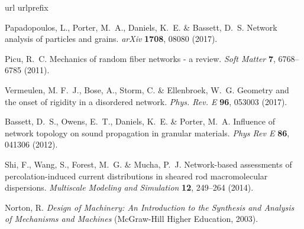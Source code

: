 \documentclass[%
preprint,
 amsmath,amssymb,
 aps,
]{revtex4-1}
\begin{document}
\begin{thebibliography}{10}
	\expandafter\ifx\csname url\endcsname\relax
	\def\url#1{\texttt{#1}}\fi
	\expandafter\ifx\csname urlprefix\endcsname\relax\def\urlprefix{URL }\fi
	\providecommand{\bibinfo}[2]{#2}
	\providecommand{\eprint}[2][]{\url{#2}}
	
	\bibinfo{author}{Papadopoulos, L.}, \bibinfo{author}{Porter, M.~A.},
	\bibinfo{author}{Daniels, K.~E.} \& \bibinfo{author}{Bassett, D.~S.}
	\newblock \bibinfo{title}{Network analysis of particles and grains}.
	\newblock \emph{\bibinfo{journal}{arXiv}} \textbf{\bibinfo{volume}{1708}},
	\bibinfo{pages}{08080} (\bibinfo{year}{2017}).
	
	\bibinfo{author}{Picu, R.~C.}
	\newblock \bibinfo{title}{Mechanics of random fiber networks - a review}.
	\newblock \emph{\bibinfo{journal}{Soft Matter}} \textbf{\bibinfo{volume}{7}},
	\bibinfo{pages}{6768--6785} (\bibinfo{year}{2011}).
	
	\bibinfo{author}{Vermeulen, M. F.~J.}, \bibinfo{author}{Bose, A.},
	\bibinfo{author}{Storm, C.} \& \bibinfo{author}{Ellenbroek, W.~G.}
	\newblock \bibinfo{title}{Geometry and the onset of rigidity in a disordered
		network}.
	\newblock \emph{\bibinfo{journal}{Phys. Rev. E}} \textbf{\bibinfo{volume}{96}},
	\bibinfo{pages}{053003} (\bibinfo{year}{2017}).
	
	\bibinfo{author}{Bassett, D.~S.}, \bibinfo{author}{Owens, E.~T.},
	\bibinfo{author}{Daniels, K.~E.} \& \bibinfo{author}{Porter, M.~A.}
	\newblock \bibinfo{title}{Influence of network topology on sound propagation in
		granular materials}.
	\newblock \emph{\bibinfo{journal}{Phys Rev E}} \textbf{\bibinfo{volume}{86}},
	\bibinfo{pages}{041306} (\bibinfo{year}{2012}).
	
	\bibinfo{author}{Shi, F.}, \bibinfo{author}{Wang, S.}, \bibinfo{author}{Forest,
		M.~G.} \& \bibinfo{author}{Mucha, P.~J.}
	\newblock \bibinfo{title}{Network-based assessments of percolation-induced
		current distributions in sheared rod macromolecular dispersions}.
	\newblock \emph{\bibinfo{journal}{Multiscale Modeling and Simulation}}
	\textbf{\bibinfo{volume}{12}}, \bibinfo{pages}{249--264}
	(\bibinfo{year}{2014}).
	
	\bibinfo{author}{Norton, R.}
	\newblock \emph{\bibinfo{title}{Design of Machinery: An Introduction to the
			Synthesis and Analysis of Mechanisms and Machines}}
	(\bibinfo{publisher}{McGraw-Hill Higher Education}, \bibinfo{year}{2003}).
	

\end{thebibliography}
\end{document}
